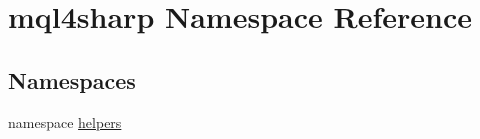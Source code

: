 \hypertarget{namespacemql4sharp}{}\section{mql4sharp Namespace Reference}
\label{namespacemql4sharp}
\subsection*{Namespaces}
\begin{DoxyCompactItemize}
\item 
namespace \hyperlink{namespacemql4sharp_1_1helpers}{helpers}
\end{DoxyCompactItemize}
